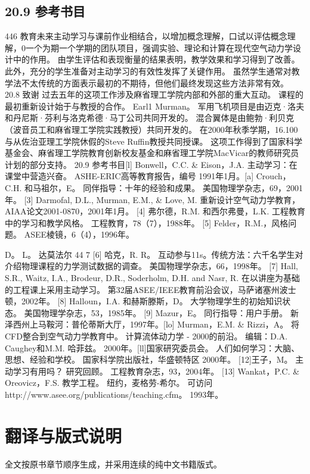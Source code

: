 \documentclass[UTF8,11pt,a4paper,openany,fontset=fandol]{ctexbook}
\begin{document}
\section{20.9 参考书目}
446 教育未来主动学习与课前作业相结合，以增加概念理解，口试以评估概念理解，0一个为期一个学期的团队项目，强调实验、理论和计算在现代空气动力学设计中的作用。 由学生评估和表现衡量的结果表明，教学效果和学习得到了改善。 此外，充分的学生准备对主动学习的有效性发挥了关键作用。 虽然学生通常对教学法不太传统的方面表示最初的不期待，但他们最终发现这些方法非常有效。 20.8 致谢 过去五年的这项工作涉及麻省理工学院内部和外部的重大互动。 课程的最初重新设计始于与教授的合作。 Earl1 Murman。 军用飞机项目是由迈克·洛夫和丹尼斯·芬利与洛克希德·马丁公司共同开发的。 混合翼体是由鲍勃·利贝克（波音员工和麻省理工学院实践教授）共同开发的。 在2000年秋季学期，16.100与从佐治亚理工学院休假的Steve Ruffin教授共同授课。 这项工作得到了国家科学基金会、麻省理工学院教育创新校友基金和麻省理工学院MacVicar的教师研究员计划的部分支持。 20.9 参考书目[l] Bonwell，C.C. \& Eison，J.A. 主动学习：在课堂中营造兴奋。 ASHE-ERIC高等教育报告，编号 1991年1月。[a] Crouch，C.H. 和马祖尔，E。 同伴指导：十年的经验和成果。 美国物理学杂志，69，2001年。 [3] Darmofal, D.L., Murman, E.M., \& Love, M. 重新设计空气动力学教育，AIAA论文2001-0870，2001年1月。 [4] 弗尔德，R.M. 和西尔弗曼，L.K. 工程教育中的学习和教学风格。 工程教育，78（7），1988年。 [5] Felder，R.M.，风格问题。 ASEE棱镜，6（4），1996年。

D。 L。 达莫法尔 44 7 [6] 哈克，R. R。 互动参与11s。传统方法：六千名学生对介绍物理课程的力学测试数据的调查。 美国物理学杂志，66，1998年。 [7] Hall, S.R., Waitz, I.A., Brodeur, D.R., Soderholm, D.H. and Nasr, R. 在以讲座为基础的工程课上采用主动学习。 第32届ASEE/IEEE教育前沿会议，马萨诸塞州波士顿，2002年。 [8] Halloun，I.A. 和赫斯滕斯，D。 大学物理学生的初始知识状态。 美国物理学杂志，53，1985年。 [9] Mazur，E。 同行指导：用户手册。 新泽西州上马鞍河：普伦蒂斯大厅，1997年。[lo] Murman，E.M. \& Rizzi，A。 将CFD整合到空气动力学教育中。 计算流体动力学 - 2000的前沿。 编辑：D.A. Caughey和M.M. 哈菲兹。 2000年。[ll]国家研究委员会。 人们如何学习：大脑、思想、经验和学校。 国家科学院出版社，华盛顿特区 2000年。 [12]王子，M。 主动学习有用吗？ 研究回顾。 工程教育杂志，93，2004年。 [13] Wankat，P.C. \& Oreovicz，F.S. 教学工程。 纽约，麦格劳-希尔。 可访问http://www.asee.org/publications/teaching.cfm。 1993年。

\backmatter
\chapter*{翻译与版式说明}
全文按原书章节顺序生成，并采用连续的纯中文书籍版式。
\end{document}
